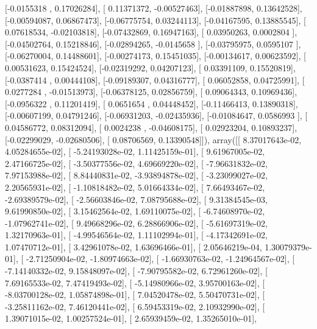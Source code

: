 \documentclass{article}
\begin{document}
       [-0.0155318 ,  0.17026284],
       [ 0.11371372, -0.00527463],
       [-0.01887898,  0.13642528],
       [-0.00594087,  0.06867473],
       [-0.06775754,  0.03244113],
       [-0.04167595,  0.13885545],
       [ 0.07618534, -0.02103818],
       [-0.07432869,  0.16947163],
       [ 0.03950263,  0.0002804 ],
       [-0.04502764,  0.15218846],
       [-0.02894265, -0.0145658 ],
       [-0.03795975,  0.0595107 ],
       [-0.06270004,  0.14488601],
       [-0.00274173,  0.15451035],
       [-0.00134617,  0.00623592],
       [ 0.00531623,  0.15424524],
       [-0.02319292,  0.04207123],
       [ 0.03391109,  0.15520819],
       [-0.0387414 ,  0.00444108],
       [-0.09189307,  0.04316777],
       [ 0.06052858,  0.04725991],
       [ 0.0277284 , -0.01513973],
       [-0.06378125,  0.02856759],
       [ 0.09064343,  0.10969436],
       [-0.0956322 ,  0.11201419],
       [ 0.0651654 ,  0.04448452],
       [-0.11466413,  0.13890318],
       [-0.00607199,  0.04791246],
       [-0.06931203, -0.02435936],
       [-0.01084647,  0.0586993 ],
       [ 0.04586772,  0.08312094],
       [ 0.0024238 , -0.04608175],
       [ 0.02923204,  0.10893237],
       [-0.02299029, -0.02680506],
       [ 0.08706569,  0.13390548]]), array([[  8.37017643e-02,   4.05284655e-02],
       [ -5.24193028e-02,   1.11425159e-01],
       [  9.61967005e-02,   2.47166725e-02],
       [ -3.50377556e-02,   4.69669220e-02],
       [ -7.96631832e-02,   7.97153988e-02],
       [  8.84440831e-02,  -3.93894878e-02],
       [ -3.23099027e-02,   2.20565931e-02],
       [ -1.10818482e-02,   5.01664334e-02],
       [  7.66493467e-02,  -2.69389579e-02],
       [ -2.56603846e-02,   7.08795688e-02],
       [  9.31384545e-03,   9.61990850e-02],
       [  3.15462564e-02,   1.69110075e-02],
       [ -6.74608970e-02,  -1.07962741e-02],
       [  9.49668296e-02,   6.28866906e-02],
       [ -5.61697319e-02,   1.32170963e-01],
       [ -4.99546564e-02,   1.11102994e-01],
       [ -4.17342691e-02,   1.07470712e-01],
       [  3.42961078e-02,   1.63696466e-01],
       [  2.05646219e-04,   1.30079379e-01],
       [ -2.71250904e-02,  -1.80974663e-02],
       [ -1.66930763e-02,  -1.24964567e-02],
       [ -7.14140332e-02,   9.15848097e-02],
       [ -7.90795582e-02,   6.72961260e-02],
       [  7.69165533e-02,   7.47419493e-02],
       [ -5.14980966e-02,   3.95700163e-02],
       [ -8.03700128e-02,   1.05874898e-01],
       [  7.04520478e-02,   5.50470731e-02],
       [ -3.25811162e-02,   7.46120441e-02],
       [  6.59453319e-02,   2.10932990e-02],
       [  1.39071015e-02,   1.00257524e-01],
       [  2.65939459e-02,   1.35265010e-01],
\end{document}
